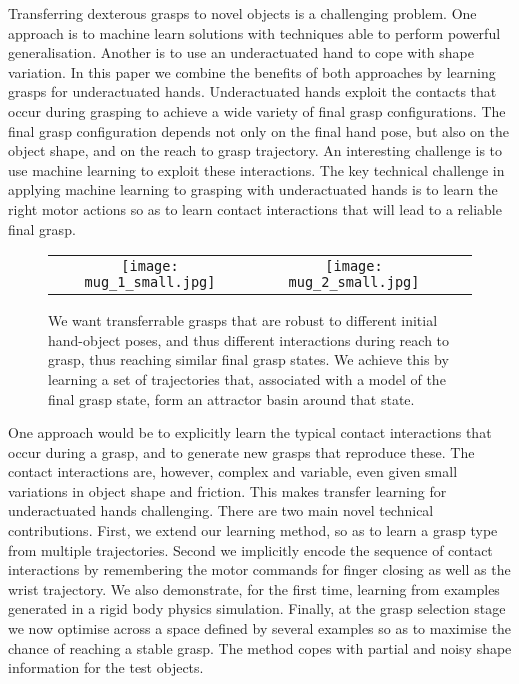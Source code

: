 Transferring dexterous grasps to novel objects is a challenging problem. One approach is to machine learn solutions with techniques able to perform powerful generalisation. Another is to use an underactuated hand to cope with shape variation. In this paper we combine the benefits of both approaches by learning grasps for underactuated hands. Underactuated hands exploit the contacts that occur during grasping to achieve a wide variety of final grasp configurations. The final grasp configuration depends not only on the final hand pose, but also on the object shape, and on the reach to grasp trajectory. An interesting challenge is to use machine learning to exploit these interactions. The key technical challenge in applying machine learning to grasping with underactuated hands is to learn the right motor actions so as to learn contact interactions that will lead to a reliable final grasp.

\begin{figure}
  \centering
  \begin{tabular}{ccc}
  \texttt{[image: mug\_1\_small.jpg]} &
  \texttt{[image: mug\_2\_small.jpg]} \\
  \end{tabular}
 \caption{{We want transferrable grasps that are robust to different initial hand-object poses, and thus different interactions during reach to grasp, thus reaching similar final grasp states. We achieve this by learning a set of trajectories that, associated with a model of the final grasp state, form an attractor basin around that state.}}
  \label{fig:two_grasps}
\end{figure}

One approach would be to explicitly learn the typical contact interactions that occur during a grasp, and to generate new grasps that reproduce these. The contact interactions are, however, complex and variable, even given small variations in object shape and friction. This makes transfer learning for underactuated hands challenging. There are two main novel technical contributions. First, we extend our learning method, so as to learn a grasp type from multiple trajectories. Second we implicitly encode the sequence of contact interactions by remembering the motor commands for finger closing as well as the wrist trajectory. We also demonstrate, for the first time, learning from examples generated in a rigid body physics simulation. Finally, at the grasp selection stage we now optimise across a space defined by several examples so as to maximise the chance of reaching a stable grasp. The method copes with partial and noisy shape information for the test objects. 


